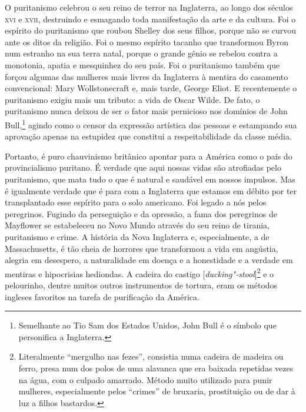O puritanismo celebrou o seu reino de terror na Inglaterra, ao longo dos
séculos \textsc{xvi} e \textsc{xvii}, destruindo e esmagando toda manifestação da arte e
da cultura. Foi o espírito do puritanismo que roubou Shelley dos seus
filhos, porque não se curvou ante os ditos da religião. Foi o mesmo
espírito tacanho que transformou Byron num estranho na sua terra natal, porque
o grande gênio se rebelou contra a monotonia, apatia e mesquinhez do seu
país. Foi o puritanismo também que forçou algumas das mulheres mais
livres da Inglaterra à mentira do casamento convencional: Mary Wollstonecraft e,
mais tarde, George Eliot. E recentemente o puritanismo exigiu mais um
tributo: a vida de Oscar Wilde. De fato, o puritanismo nunca deixou de
ser o fator mais pernicioso nos domínios de John Bull,\footnote{Semelhante
  ao Tio Sam dos Estados Unidos, John Bull é o símbolo que personifica a
  Inglaterra.} agindo como o censor da expressão artística das pessoas e
estampando sua aprovação apenas na estupidez que constitui a
respeitabilidade da classe média.

Portanto, é puro chauvinismo britânico apontar para a América como o
país do provincialismo puritano. É verdade que aqui nossas vidas são
atrofiadas pelo puritanismo, que mata tudo o que é natural e saudável em
nossos impulsos. Mas é igualmente verdade que é para com a Inglaterra
que estamos em débito por ter transplantado esse espírito para o solo
americano. Foi legado a nós pelos peregrinos. Fugindo da perseguição e
da opressão, a fama dos peregrinos de Mayflower se estabeleceu no Novo
Mundo através do seu reino de tirania, puritanismo e crime. A história
da Nova Inglaterra e, especialmente, a de Massachusetts, é tão cheia de
horrores que transformou a vida em angústia, alegria em desespero, a
naturalidade em doença e a honestidade e a verdade em mentiras e
hipocrisias hediondas. A cadeira do castigo
{[}\emph{ducking"-stool}{]}\footnote{Literalmente ``mergulho nas fezes'',
  consistia numa cadeira de madeira ou ferro, presa num dos polos de uma
  alavanca que era baixada repetidas vezes na água, com o culpado
  amarrado. Método muito utilizado para punir mulheres, especialmente
  pelos ``crimes'' de bruxaria, prostituição ou de dar à luz a filhos
  bastardos.} e o pelourinho, dentre muitos outros instrumentos de
tortura, eram os métodos ingleses favoritos na tarefa de purificação da
América.

